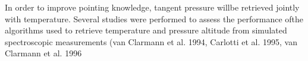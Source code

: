 In order to improve pointing
knowledge, tangent pressure willbe
retrieved jointly with temperature.
Several studies were performed to
assess the performance ofthe
algorithms used to retrieve
temperature and pressure altitude
from simulated spectroscopic
measurements (van Clarmann et al.
1994, Carlotti et al. 1995,
van Clarmann et al. 1996


















